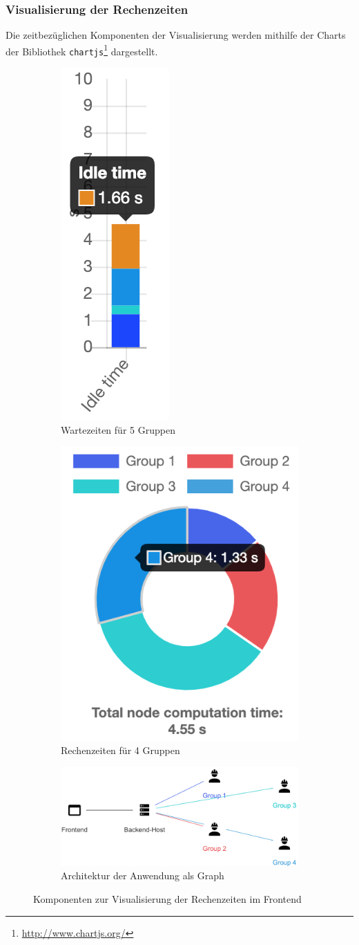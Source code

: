 \subsubsection{Visualisierung der Rechenzeiten} %

Die zeitbezüglichen Komponenten der Visualisierung werden mithilfe der Charts
der Bibliothek \verb|chartjs|\footnote{\url{http://www.chartjs.org/}} dargestellt.
\begin{figure}[t!]
	\centering
	\begin{subfigure}[t]{0.3\textwidth}
		\centering
		\includegraphics[height=.5\linewidth]{img/Implementierung/IdleTime}
		\caption{Wartezeiten für 5 Gruppen}
		\label{fig:idleTime}
	\end{subfigure}%
	\begin{subfigure}[t]{0.3\textwidth}
		\centering
		\includegraphics[height=.5\linewidth]{img/Implementierung/ComputationTime}
		\caption{Rechenzeiten für 4 Gruppen}
		\label{fig:computationTime}
	\end{subfigure}
	\begin{subfigure}[t]{0.3\textwidth}
		\centering
		\includegraphics[width=\linewidth]{img/Implementierung/NetworkView}
		\caption{Architektur der Anwendung als Graph
		}\label{fig:networkView}
	\end{subfigure}
	\caption{Komponenten zur Visualisierung der Rechenzeiten im Frontend}
\end{figure}


